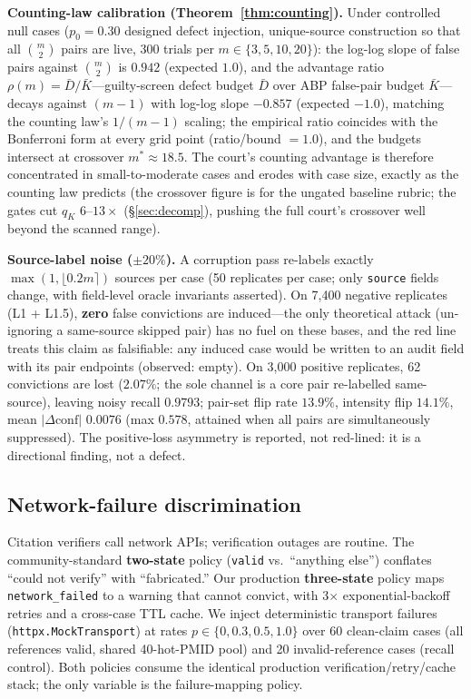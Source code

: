 \documentclass[11pt]{article}
\begin{document}
\textbf{Counting-law calibration (Theorem~\ref{thm:counting}).} Under
controlled null cases ($p_0=0.30$ designed defect injection, unique-source
construction so that all $\binom{m}{2}$ pairs are live, 300 trials per
$m\in\{3,5,10,20\}$): the log-log slope of false pairs against
$\binom{m}{2}$ is $0.942$ (expected $1.0$), and the advantage ratio
$\rho(m)=\bar D/\bar K$—guilty-screen defect budget $\bar D$ over ABP
false-pair budget $\bar K$—decays against $(m-1)$ with log-log slope
$-0.857$ (expected $-1.0$), matching the counting law's $1/(m-1)$
scaling; the empirical ratio coincides with the Bonferroni form at every
grid point (ratio/bound $=1.0$), and the budgets intersect at crossover
$m^\ast\!\approx\!18.5$. The court's counting advantage is therefore
concentrated in small-to-moderate cases and erodes with case size, exactly
as the counting law predicts (the crossover figure is for the ungated
baseline rubric; the gates cut $q_K$ $6$--$13\times$
(\S\ref{sec:decomp}), pushing the full court's crossover well beyond the
scanned range).

\textbf{Source-label noise ($\pm 20\%$).} A corruption pass re-labels
exactly $\max(1, \lfloor 0.2m \rceil)$ sources per case (50 replicates per
case; only \texttt{source} fields change, with field-level oracle
invariants asserted). On 7{,}400 negative replicates (L1 + L1.5),
\textbf{zero} false convictions are induced—the only theoretical attack
(un-ignoring a same-source skipped pair) has no fuel on these bases, and
the red line treats this claim as falsifiable: any induced case would be
written to an audit field with its pair endpoints (observed: empty). On
3{,}000 positive replicates, 62 convictions are lost ($2.07\%$; the sole
channel is a core pair re-labelled same-source), leaving noisy recall
$0.9793$; pair-set flip rate $13.9\%$, intensity flip $14.1\%$, mean
$|\Delta\text{conf}|$ $0.0076$ (max $0.578$, attained when all pairs are
simultaneously suppressed). The positive-loss asymmetry is reported, not
red-lined: it is a directional finding, not a defect.

\subsection{Network-failure discrimination}\label{sec:network}

Citation verifiers call network APIs; verification outages are routine. The
community-standard \textbf{two-state} policy (\texttt{valid} vs.\ ``anything
else'') conflates ``could not verify'' with ``fabricated.'' Our production
\textbf{three-state} policy maps \texttt{network\_failed} to a warning that
cannot convict, with 3$\times$ exponential-backoff retries and a cross-case
TTL cache. We inject deterministic transport failures
(\texttt{httpx.MockTransport}) at rates $p\in\{0, 0.3, 0.5, 1.0\}$ over 60
clean-claim cases (all references valid, shared 40-hot-PMID pool) and 20
invalid-reference cases (recall control). Both policies consume the
identical production verification/retry/cache stack; the only variable is
the failure-mapping policy.
\end{document}

